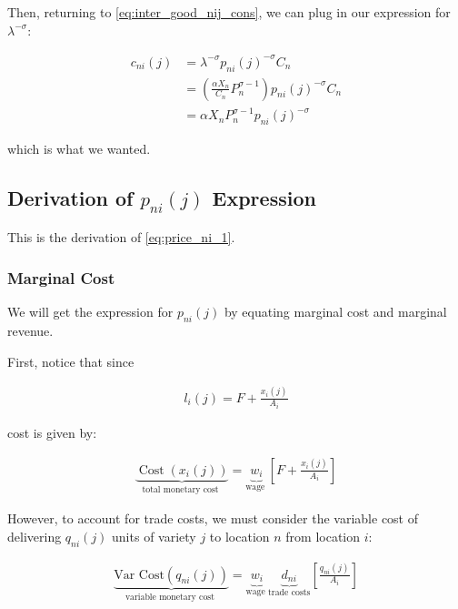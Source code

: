 \documentclass[10pt]{article}
\begin{document}
Then, returning to \eqref{eq:inter_good_nij_cons}, we can plug in our expression for $\lambda^{-\sigma}$:

\begin{align}
    c_{n i}(j) &= \lambda^{-\sigma} p_{ni}(j)^{-\sigma} C_n \\
    &= \left(\frac{\alpha X_n}{C_n} P_n^{\sigma-1}\right) p_{ni}(j)^{-\sigma} C_n \\
    &= \alpha X_n P_n^{\sigma-1} p_{ni}(j)^{-\sigma}
\end{align}

which is what we wanted.



\subsection{Derivation of $p_{n i}(j)$ Expression}
\label{sec:price_ni_1}
This is the derivation of \eqref{eq:price_ni_1}.

\subsubsection{Marginal Cost}

We will get the expression 
for $p_{n i}(j)$ by equating 
marginal cost and marginal revenue.

First, notice that since 

\begin{align}
    l_i(j)=F+\frac{x_i(j)}{A_i}
\end{align}

cost is given by:

\begin{align}
    \underbrace{\operatorname{Cost}\left(x_i(j)\right)}_{\text {total monetary cost }}=\underbrace{w_i}_{\text {wage }}\left[F+\frac{x_i(j)}{A_i}\right] \label{eq:cost_xij}
\end{align}

However, to account for trade costs,
we must consider the variable cost of 
delivering $q_{ni}(j)$ units of variety $j$
to location $n$ from location $i$:

\begin{align}
    \underbrace{\text{Var Cost}\left(q_{ni}(j)\right)}_{\text {variable monetary cost }}=\underbrace{w_i}_{\text {wage }} \underbrace{d_{ni}}_{\text{trade costs}} \left[\frac{q_{ni}(j)}{A_i}\right] \label{eq:var_cost_qnij}
\end{align}
\end{document}

